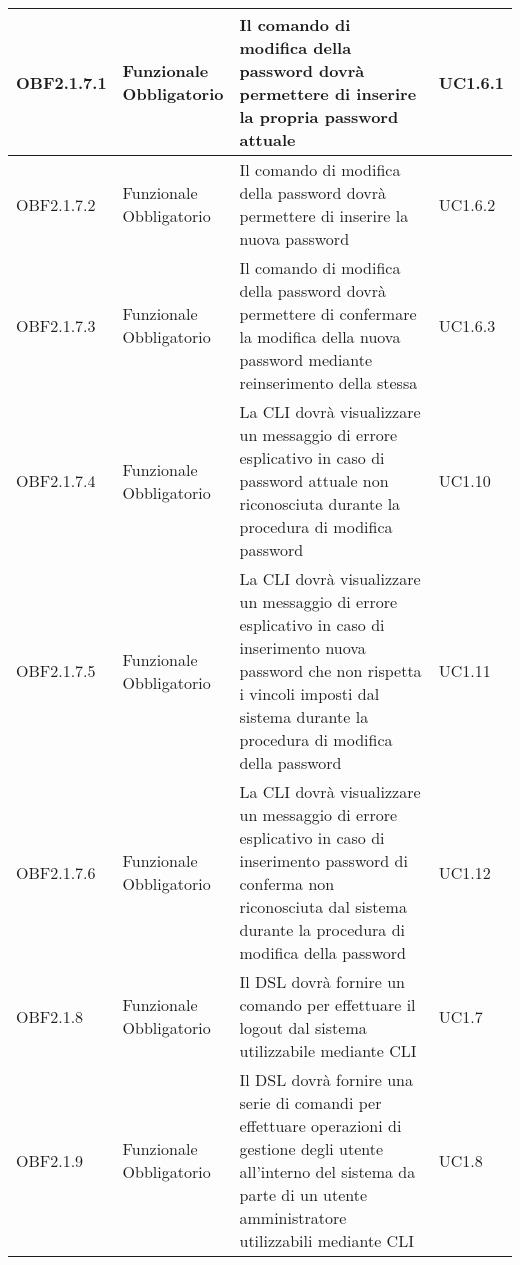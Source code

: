 \documentclass{scalatekids-article}
\begin{document}
\begin{longtable}[H]{|l|p{2cm}|p{6cm}|p{4cm}|}
\hline
OBF2.1.7.1 & \multiLineCell{Funzionale\\Obbligatorio} & Il comando di modifica della password dovrà permettere di inserire la propria password attuale & \multiLineCell{UC1.6.1\\}\\
\hline
OBF2.1.7.2 & \multiLineCell{Funzionale\\Obbligatorio} & Il comando di modifica della password dovrà permettere di inserire la nuova password & \multiLineCell{UC1.6.2\\}\\
\hline
OBF2.1.7.3 & \multiLineCell{Funzionale\\Obbligatorio} & Il comando di modifica della password dovrà permettere di confermare la modifica della nuova password mediante reinserimento della stessa & \multiLineCell{UC1.6.3\\}\\
\hline
OBF2.1.7.4 & \multiLineCell{Funzionale\\Obbligatorio} & La CLI dovrà visualizzare un messaggio di errore esplicativo in caso di password attuale non riconosciuta durante la procedura di modifica password & \multiLineCell{UC1.10\\}\\
\hline
OBF2.1.7.5 & \multiLineCell{Funzionale\\Obbligatorio} & La CLI dovrà visualizzare un messaggio di errore esplicativo in caso di inserimento nuova password che non rispetta i vincoli imposti dal sistema durante la procedura di modifica della password & \multiLineCell{UC1.11\\}\\
\hline
OBF2.1.7.6 & \multiLineCell{Funzionale\\Obbligatorio} & La CLI dovrà visualizzare un messaggio di errore esplicativo in caso di inserimento password di conferma non riconosciuta dal sistema durante la procedura di modifica della password & \multiLineCell{UC1.12\\}\\
\hline
OBF2.1.8 & \multiLineCell{Funzionale\\Obbligatorio} & Il DSL dovrà fornire un comando per effettuare il logout dal sistema utilizzabile mediante CLI & \multiLineCell{UC1.7\\}\\
\hline
OBF2.1.9 & \multiLineCell{Funzionale\\Obbligatorio} & Il DSL dovrà fornire una serie di comandi per effettuare operazioni di gestione degli utente all'interno del sistema da parte di un utente amministratore utilizzabili mediante CLI & \multiLineCell{UC1.8\\}\\

\end{longtable}
\end{document}

